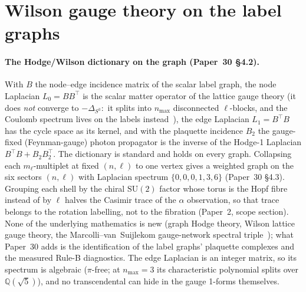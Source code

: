 \documentclass[aps,pra,twocolumn,superscriptaddress,longbibliography]{revtex4-2}
\newcommand{\gvc}[2]{#2}
\begin{document}
\section{Wilson gauge theory on the label graphs}\label{sec:gauge}

\paragraph{The Hodge/Wilson dictionary on the graph (Paper~30 \S4.2).}
With $B$ the node--edge incidence matrix of the scalar label graph, the
node Laplacian $L_0=BB^{\top}$ is the scalar matter operator of the lattice
gauge theory (\gvc{graph-s3-wall}{it does \emph{not} converge to $-\Delta_{S^3}$:\ it splits
into $n_{\max}$ disconnected $\ell$-blocks, and the Coulomb spectrum
lives on the labels instead~\cite{loutey_paper7}}), the edge Laplacian
$L_1=B^{\top}B$ has the cycle space as its kernel, and with the plaquette
incidence $B_2$ the gauge-fixed (Feynman-gauge) photon propagator is the
inverse of the Hodge-1 Laplacian $B^{\top}B+B_2B_2^{\top}$.  The
dictionary is standard and holds on every graph.  Collapsing each
$m_\ell$-multiplet at fixed $(n,\ell)$ to one vertex gives a weighted graph
on the six sectors $(n,\ell)$ with Laplacian spectrum $\{0,0,0,1,3,6\}$
(Paper~30 \S4.3).  Grouping each shell by the chiral $\mathrm{SU}(2)$ factor
whose torus is the Hopf fibre instead of by $\ell$ halves the Casimir trace
of the $\alpha$ observation, so that trace belongs to the rotation
labelling, not to the fibration (Paper~2, scope section).  None of the
underlying mathematics is new (graph Hodge theory, Wilson lattice gauge
theory, the Marcolli--van~Suijlekom gauge-network spectral
triple~\cite{marcolli_vs}); what Paper~30 adds is the identification of the
label graphs' plaquette complexes and the measured Rule-B diagnostics.  The
edge Laplacian is an integer matrix, so its spectrum is algebraic
($\pi$-free; at $n_{\max}=3$ its characteristic polynomial splits over
$\mathbb{Q}(\sqrt5)$), and no transcendental can hide in the gauge
1-forms themselves.
\end{document}
